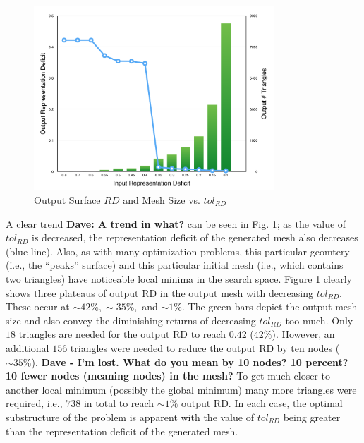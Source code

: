 \begin{figure}[h!]
  \begin{center}
  \includegraphics[width=90mm]{Figures/RDvsMeshSize.png}
  \caption{Output Surface $RD$ and Mesh Size vs. $tol_{RD}$}
  \label{fig_RDvsMeshSize}
  \end{center}
\end{figure}

A clear trend {\bf{Dave: A trend in what?}} can be seen in 
Fig. \ref{fig_RDvsMeshSize}; as the value of
$tol_{RD}$ is decreased, the representation deficit of the generated mesh
also decreases (blue line). Also, as with many optimization problems,
this particular geomtery (i.e., the ``peaks'' surface) and this particular 
initial mesh (i.e., which contains two triangles) have noticeable local 
minima in the search space.
Figure \ref{fig_RDvsMeshSize} clearly shows three plateaus of output
RD in the output mesh with decreasing $tol_{RD}$. These occur at
$\sim42\%, \sim35\%,$ and $\sim1\%$. The green bars depict the output
mesh size and also convey the diminishing returns of decreasing
$tol_{RD}$ too much. Only $18$ triangles are needed for the output RD to
reach $0.42$ ($42\%$). However, an additional $156$ triangles were
needed to reduce the output RD by ten nodes ($\sim 35\%$). {\bf{Dave - 
I'm lost. What do you mean by 10 nodes?  10 percent?  10 fewer nodes 
(meaning nodes) in the mesh?}}  To get much closer to another local 
minimum (possibly the global minimum) many
more triangles were required, i.e., $738$ in total to reach $\sim 1\%$ 
output RD. In each case, the optimal substructure of the problem is 
apparent with the value of $tol_{RD}$ being greater than the 
representation deficit of the generated mesh.
